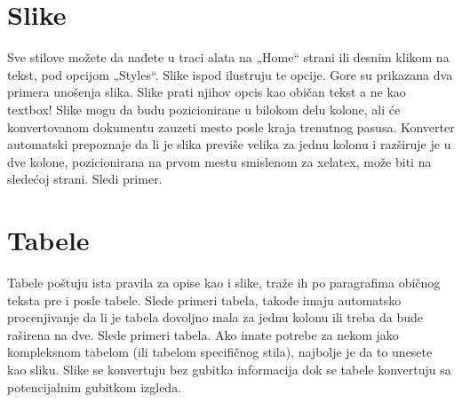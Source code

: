 \section{Slike}
Sve stilove možete da nađete u traci alata na „Home“ strani ili desnim klikom na tekst, pod opcijom „Styles“. Slike ispod ilustruju te opcije.
Gore su prikazana dva primera unošenja slika. Slike prati njihov opcis kao običan tekst a ne kao textbox! Slike mogu da budu pozicionirane u bilokom delu kolone, ali će konvertovanom dokumentu zauzeti mesto posle kraja trenutnog pasusa.
Konverter automatski prepoznaje da li je slika previše velika za jednu kolonu i razširuje je u dve kolone, pozicionirana na prvom mestu smislenom za xelatex, može biti na sledećoj strani. Sledi primer.
\section{Tabele}
Tabele poštuju ista pravila za opise kao i slike, traže ih po paragrafima običnog teksta pre i posle tabele. Slede primeri tabela, takođe imaju automatsko procenjivanje da li je tabela dovoljno mala za jednu kolonu ili treba da bude raširena na dve. Slede primeri tabela.
Ako imate potrebe za nekom jako kompleksnom tabelom (ili tabelom specifičnog stila), najbolje je da to unesete kao sliku. Slike se konvertuju bez gubitka
informacija dok se tabele konvertuju sa potencijalnim gubitkom izgleda.
